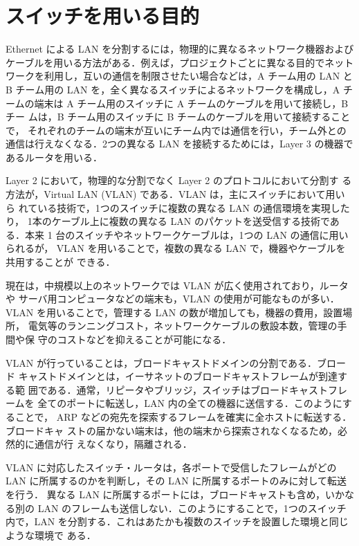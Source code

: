 \section{スイッチを用いる目的}

Ethernet による LAN を分割するには，物理的に異なるネットワーク機器および
ケーブルを用いる方法がある．例えば，プロジェクトごとに異なる目的でネット
ワークを利用し，互いの通信を制限させたい場合などは，A チーム用の LAN と 
B チーム用の LAN を，全く異なるスイッチによるネットワークを構成し，A チームの端末は A チーム用のスイッチに A チームのケーブルを用いて接続し，B チー
ムは，B チーム用のスイッチに B チームのケーブルを用いて接続することで，
それぞれのチームの端末が互いにチーム内では通信を行い，チーム外との通信は行えなくなる．2つの異なる LAN を接続するためには，Layer 3 の機器であるルータを用いる．

Layer 2 において，物理的な分割でなく Layer 2 のプロトコルにおいて分割す
る方法が，Virtual LAN (VLAN) である．VLAN は，主にスイッチにおいて用いら
れている技術で，1つのスイッチに複数の異なる LAN の通信環境を実現したり，
1本のケーブル上に複数の異なる LAN のパケットを送受信する技術である．本来
1 台のスイッチやネットワークケーブルは，1つの LAN の通信に用いられるが，
VLAN を用いることで，複数の異なる LAN で，機器やケーブルを共用することが
できる．

現在は，中規模以上のネットワークでは VLAN が広く使用されており，ルータや
サーバ用コンピュータなどの端末も，VLAN の使用が可能なものが多い．
VLAN を用いることで，管理する LAN の数が増加しても，機器の費用，設置場所，
電気等のランニングコスト，ネットワークケーブルの敷設本数，管理の手間や保
守のコストなどを抑えることが可能になる．

VLAN が行っていることは，ブロードキャストドメインの分割である．ブロード
キャストドメインとは，イーサネットのブロードキャストフレームが到達する範
囲である．通常，リピータやブリッジ，スイッチはブロードキャストフレームを
全てのポートに転送し，LAN 内の全ての機器に送信する．このようにすることで，
ARP などの宛先を探索するフレームを確実に全ホストに転送する．ブロードキャ
ストの届かない端末は，他の端末から探索されなくなるため，必然的に通信が行
えなくなり，隔離される．

VLAN に対応したスイッチ・ルータは，各ポートで受信したフレームがどのLAN 
に所属するのかを判断し，その LAN に所属するポートのみに対して転送を行う．
異なる LAN に所属するポートには，ブロードキャストも含め，いかなる別の 
LAN のフレームも送信しない．このようにすることで，1つのスイッチ内で，LAN 
を分割する．これはあたかも複数のスイッチを設置した環境と同じような環境で
ある．

